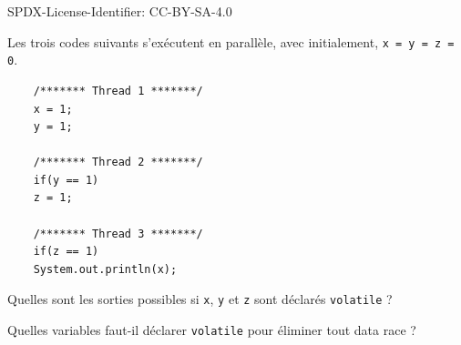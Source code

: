  SPDX-License-Identifier: CC-BY-SA-4.0

\begingroup

\begin{exercice}[Volatilité]
  \label{exo:memory/volatile}

  Les trois codes suivants s'exécutent en parallèle, avec initialement, \lstinline{x = y = z = 0}.

  \begin{lstlisting}
    /******* Thread 1 *******/
    x = 1;
    y = 1;
    
    /******* Thread 2 *******/
    if(y == 1)
    z = 1;

    /******* Thread 3 *******/
    if(z == 1)
    System.out.println(x);
  \end{lstlisting}

  \begin{questions}
  \item Quelles sont les sorties possibles si \lstinline{x}, \lstinline{y} et \lstinline{z} sont déclarés \lstinline{volatile} ?
  \item Quelles variables faut-il déclarer \lstinline{volatile} pour éliminer tout data race ?
  \end{questions}

\end{exercice}

\endgroup
\endinput
